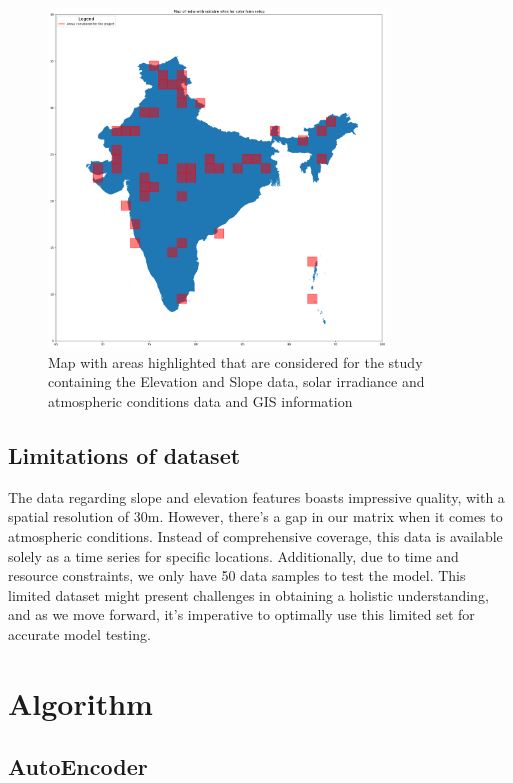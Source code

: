 \documentclass[a4paper,12pt]{Classes/RoboticsLaTeX}
\begin{document}
	\begin{figure}[H]
		\centering
		\includegraphics[width=0.8\textwidth]{Figures/india_map_with_highlighted_data.png} %
		\caption{Map with areas highlighted that are considered for the study containing the Elevation and Slope data, solar irradiance and atmospheric conditions data and GIS information}
		\label{fig:my_label5} %
	\end{figure}

	\subsection{Limitations of dataset}

	The data regarding slope and elevation features boasts impressive quality, with a spatial resolution of 30m. However, there's a gap in our matrix when it comes
	 to atmospheric conditions. Instead of comprehensive coverage, this data is available solely as a time series for specific locations. Additionally, due to time and 
	 resource constraints, we only have 50 data samples to test the model. This limited dataset might 
	 present challenges in obtaining a holistic understanding, and as we move forward, it's imperative 
	 to optimally use this limited set for accurate model testing.
	 
	\section{Algorithm}
	\subsection{AutoEncoder}
\end{document}
